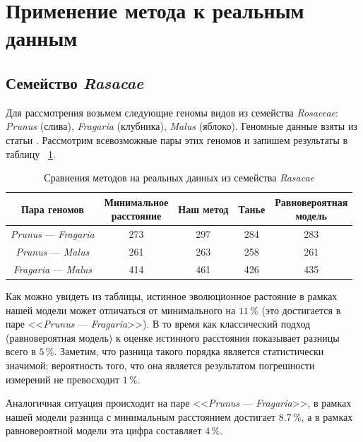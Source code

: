 \section{Применение метода к реальным данным}
\subsection{Семейство \emph{Rasacae}}

Для рассмотрения возьмем следующие геномы  видов из семейства \emph{Rosaceae}: \emph{Prunus} (слива), \emph{Fragaria} (клубника), \emph{Malus} (яблоко).
Геномные данные взяты из статьи \cite{real-data}.
Рассмотрим всевозможные пары этих геномов и запишем результаты в таблицу ~\ref{real-data-rasacae}.
\begin{table}[!h]
    \caption{Сравнения методов на реальных данных из семейства \emph{Rasacae}}
    \centering
    \begin{tabular}{|*{5}{c|}}\hline
        Пара геномов &  \makecell{Минимальное \\ расстояние}
                     & Наш метод
                     & Танье
                     & \makecell{Равновероятная \\ модель} \\\hline
        \emph{Prunus} --- \emph{Fragaria}    & 273 & 297 & 284 & 283     \\\hline
        \emph{Prunus} --- \emph{Malus}     & 261 & 263 & 258 & 261    \\\hline
        \emph{Fragaria} --- \emph{Malus} & 414 & 461 & 426 & 435   \\\hline
    \end{tabular}
    \label{real-data-rasacae}
\end{table}

Как можно увидеть из таблицы, истинное эволюционное растояние в рамках нашей модели может отличаться от минимального на $11 \, \%$ (это достигается в паре <<\emph{Prunus} --- \emph{Fragaria}>>).
В то время как классический подход (равновероятная модель) к оценке истинного расстояния показывает разницы всего в $5 \, \%$.
Заметим, что разница такого порядка является статистически значимой; вероятность того, что она  является результатом погрешности измерений не превосходит $1 \, \%$.

Аналогичная ситуация происходит на паре <<\emph{Prunus} --- \emph{Fragaria}>>, в рамках нашей модели разница с минимальным расстоянием достигает $8.7 \, \%$, а в рамках равновероятной модели эта цифра составляет $4 \, \%$.

